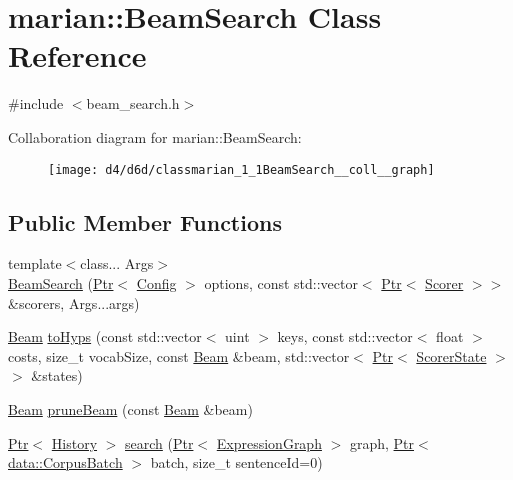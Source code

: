 \hypertarget{classmarian_1_1BeamSearch}{}\section{marian\+:\+:Beam\+Search Class Reference}
\label{classmarian_1_1BeamSearch}


{\ttfamily \#include $<$beam\+\_\+search.\+h$>$}



Collaboration diagram for marian\+:\+:Beam\+Search\+:
\nopagebreak
\begin{figure}[H]
\begin{center}
\leavevmode
\texttt{[image: d4/d6d/classmarian\_1\_1BeamSearch\_\_coll\_\_graph]}
\end{center}
\end{figure}
\subsection*{Public Member Functions}
\begin{DoxyCompactItemize}
\item 
{\footnotesize template$<$class... Args$>$ }\\\hyperlink{classmarian_1_1BeamSearch_a282d9a309dd3d7b55856d79e31e36d70}{Beam\+Search} (\hyperlink{namespacemarian_ad1a373be43a00ef9ce35666145137b08}{Ptr}$<$ \hyperlink{classmarian_1_1Config}{Config} $>$ options, const std\+::vector$<$ \hyperlink{namespacemarian_ad1a373be43a00ef9ce35666145137b08}{Ptr}$<$ \hyperlink{classmarian_1_1Scorer}{Scorer} $>$$>$ \&scorers, Args...\+args)
\item 
\hyperlink{namespacemarian_aebdf5ddcd9e7774939696be6e1ceb8f0}{Beam} \hyperlink{classmarian_1_1BeamSearch_af828b92dcf04511ea9cf2816ec9c2ee7}{to\+Hyps} (const std\+::vector$<$ uint $>$ keys, const std\+::vector$<$ float $>$ costs, size\+\_\+t vocab\+Size, const \hyperlink{namespacemarian_aebdf5ddcd9e7774939696be6e1ceb8f0}{Beam} \&beam, std\+::vector$<$ \hyperlink{namespacemarian_ad1a373be43a00ef9ce35666145137b08}{Ptr}$<$ \hyperlink{classmarian_1_1ScorerState}{Scorer\+State} $>$$>$ \&states)
\item 
\hyperlink{namespacemarian_aebdf5ddcd9e7774939696be6e1ceb8f0}{Beam} \hyperlink{classmarian_1_1BeamSearch_a416d9f03a6bd3f869e2dcbd1fd091390}{prune\+Beam} (const \hyperlink{namespacemarian_aebdf5ddcd9e7774939696be6e1ceb8f0}{Beam} \&beam)
\item 
\hyperlink{namespacemarian_ad1a373be43a00ef9ce35666145137b08}{Ptr}$<$ \hyperlink{classmarian_1_1History}{History} $>$ \hyperlink{classmarian_1_1BeamSearch_a6ee0fce9e694269a4c59f6afe48a4075}{search} (\hyperlink{namespacemarian_ad1a373be43a00ef9ce35666145137b08}{Ptr}$<$ \hyperlink{classmarian_1_1ExpressionGraph}{Expression\+Graph} $>$ graph, \hyperlink{namespacemarian_ad1a373be43a00ef9ce35666145137b08}{Ptr}$<$ \hyperlink{classmarian_1_1data_1_1CorpusBatch}{data\+::\+Corpus\+Batch} $>$ batch, size\+\_\+t sentence\+Id=0)
\end{DoxyCompactItemize}
